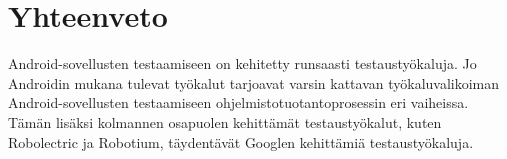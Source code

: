 \section{Yhteenveto}

Android-sovellusten testaamiseen on kehitetty runsaasti testaustyökaluja. Jo Androidin mukana tulevat työkalut tarjoavat varsin kattavan työkaluvalikoiman Android-sovellusten testaamiseen ohjelmistotuotantoprosessin eri vaiheissa. Tämän lisäksi kolmannen osapuolen kehittämät testaustyökalut, kuten Robolectric ja Robotium, täydentävät Googlen kehittämiä testaustyökaluja.